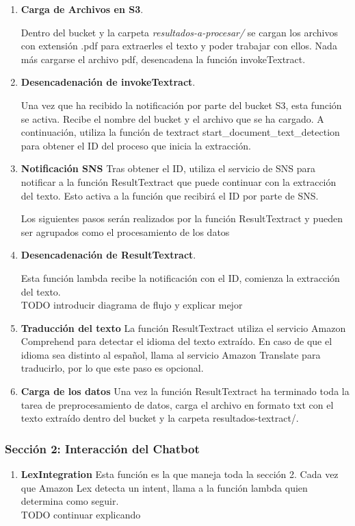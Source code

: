\begin{enumerate}
    \item \textbf{Carga de Archivos en S3}. 
    
    Dentro del bucket y la carpeta \textit{resultados-a-procesar/} se cargan los archivos con extensión .pdf para extraerles el texto y poder trabajar con ellos. Nada más cargarse el archivo pdf, desencadena la función invokeTextract. 
    
    \item \textbf{Desencadenación de invokeTextract}. 
    
    Una vez que ha recibido la notificación por parte del bucket S3, esta función se activa. Recibe el nombre del bucket y el archivo que se ha cargado. A continuación, utiliza la función de textract start\_document\_text\_detection para obtener el ID del proceso que inicia la extracción. 

    \item \textbf{Notificación SNS}
    Tras obtener el ID, utiliza el servicio de SNS para notificar a la función ResultTextract que puede continuar con la extracción del texto. Esto activa a la función que recibirá el ID por parte de SNS.

    Los siguientes pasos serán realizados por la función ResultTextract y pueden ser agrupados como el procesamiento de los datos

    \item \textbf{Desencadenación de ResultTextract}.

    Esta función lambda recibe la notificación con el ID, comienza la extracción del texto. \\TODO introducir diagrama de flujo y explicar mejor

    \item \textbf{Traducción del texto}
    La función ResultTextract utiliza el servicio Amazon Comprehend para detectar el idioma del texto extraído. En caso de que el idioma sea distinto al español, llama al servicio Amazon Translate para traducirlo, por lo que este paso es opcional. 

    \item \textbf{Carga de los datos}
    Una vez la función ResultTextract ha terminado toda la tarea de preprocesamiento de datos, carga el archivo en formato txt con el texto extraído dentro del bucket y la carpeta resultados-textract/.
    
\end{enumerate}

\subsubsection{Sección 2: Interacción del Chatbot}
\begin{enumerate}[7.]
    \item \textbf{LexIntegration}
    Esta función es la que maneja toda la sección 2. Cada vez que Amazon Lex detecta un intent, llama a la función lambda quien determina como seguir. \\TODO continuar explicando
    
\end{enumerate}


